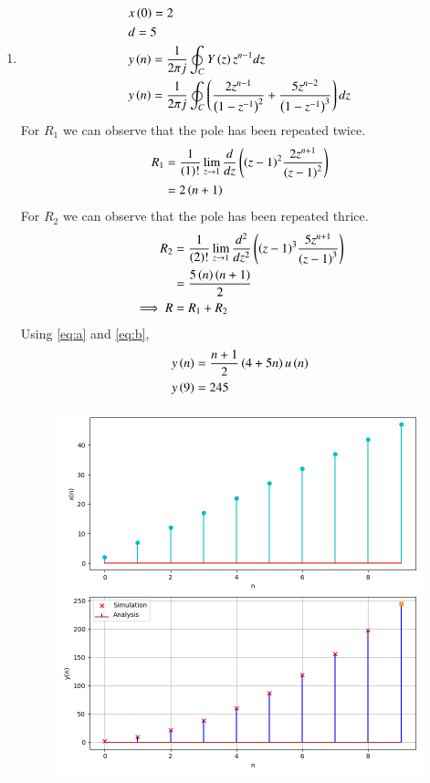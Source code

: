 \documentclass[journal,12pt,twocolumn]{IEEEtran}
\theoremstyle{remark}
\begin{document}
\begin{enumerate}[label=(\alph*)]
    \item \begin{align}
        &x\left(0\right)=2 \\
        &d=5 \\
        &y\left(n\right)=\frac{1}{2\pi j}\oint_{C}Y\left(z\right)z^{n-1}dz  \\
        &y\left(n\right)=\frac{1}{2\pi j}\oint_{C}\left(\dfrac{2z^{n-1}}{\left(1-z^{-1}\right)^2} + \dfrac{5z^{n-2}}{\left(1-z^{-1}\right)^{3}}\right)dz \\
    \end{align}
    For $R_1$ we can observe that the pole has been repeated twice.
\begin{align}
    R_1&=\frac{1}{\left(1\right)!}\lim\limits_{z\to 1}\frac{d}{dz}\left({\left(z-1\right)}^{2}\frac{2z^{n+1}}{{\left(z-1\right)}^2}\right)\\
    &=2\left(n+1\right)\label{eq:a}
\end{align}
    For $R_2$ we can observe that the pole has been repeated thrice.
\begin{align}
    R_2&=\frac{1}{\left(2\right)!}\lim\limits_{z\to 1}\frac{d^{2}}{dz^{2}}\left({\left(z-1\right)}^{3}\frac{5z^{n+1}}{{\left(z-1\right)}^3}\right)\\
    &=\frac{5\left(n\right)\left(n+1\right)}{2}\label{eq:b} \\
    \implies R&= R_1 + R_2
\end{align}
Using \eqref{eq:a} and \eqref{eq:b},
\begin{align}
    &y\left(n\right)=\dfrac{n+1}{2}\left(4+5n\right)u\left(n\right) \\
    &y\left(9\right)=245
\end{align}
    \begin{figure}[h!]
        \centering
        \includegraphics[width=\columnwidth]{figs/plt1.png}

\end{figure}
\end{enumerate}
\end{document}
